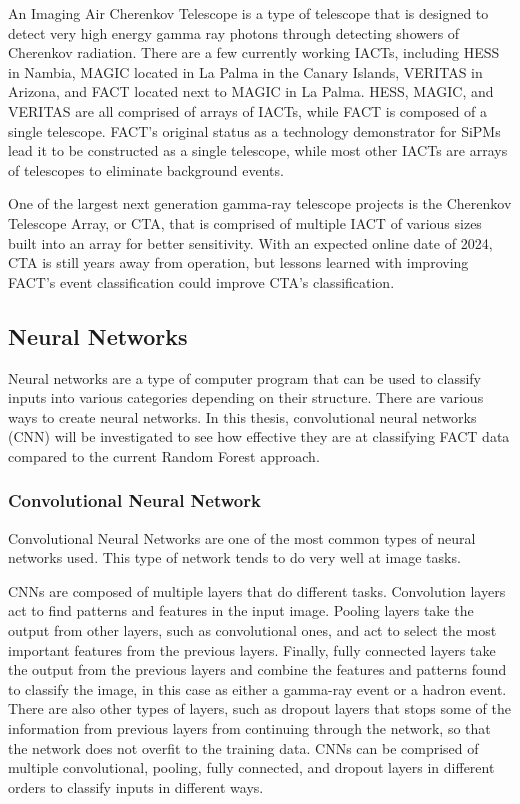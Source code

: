 \documentclass[12pt]{article}
\begin{document}
An Imaging Air Cherenkov Telescope is a type of telescope that is designed to detect very high energy gamma ray photons through detecting showers of Cherenkov radiation. There are a few currently working IACTs, including HESS\cite{2004NewAR..48..331H} in Nambia, MAGIC\cite{aleksic2016major} located in La Palma in the Canary Islands, VERITAS\cite{park2015performance} in Arizona, and FACT\cite{1748-0221-8-06-P06008} located next to MAGIC in La Palma. HESS, MAGIC, and VERITAS are all comprised of arrays of IACTs, while FACT is composed of a single telescope. FACT's original status as a technology demonstrator for SiPMs lead it to be constructed as a single telescope, while most other IACTs are arrays of telescopes to eliminate background events.

One of the largest next generation gamma-ray telescope projects is the Cherenkov Telescope Array, or CTA, that is comprised of multiple IACT of various sizes built into an array for better sensitivity. With an expected online date of 2024, CTA is still years away from operation, but lessons learned with improving FACT's event classification could improve CTA's classification.

\subsection{Neural Networks}\label{sec:NN}

Neural networks are a type of computer program that can be used to classify inputs into various categories depending on their structure. There are various ways to create neural networks. In this thesis, convolutional neural networks (CNN) will be investigated to see how effective they are at classifying FACT data compared to the current Random Forest approach.

\subsubsection{Convolutional Neural Network}\label{sec:cnn}

Convolutional Neural Networks are one of the most common types of neural networks used. This type of network tends to do very well at image tasks. 

CNNs are composed of multiple layers that do different tasks. Convolution layers act to find patterns and features in the input image. Pooling layers take the output from other layers, such as convolutional ones, and act to select the most important features from the previous layers. Finally, fully connected layers take the output from the previous layers and combine the features and patterns found to classify the image, in this case as either a gamma-ray event or a hadron event. There are also other types of layers, such as dropout layers that stops some of the information from previous layers from continuing through the network, so that the network does not overfit to the training data. CNNs can be comprised of multiple convolutional, pooling, fully connected, and dropout layers in different orders to classify inputs in different ways. 
\end{document}
